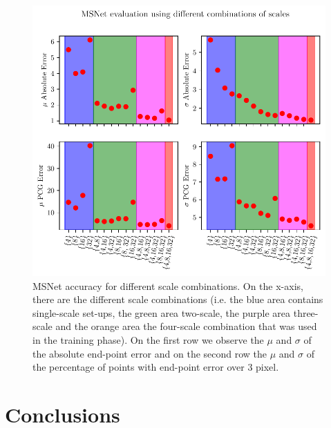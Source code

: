 \documentclass[10pt]{article}
\begin{document}
\begin{figure}
    \centering
    \includegraphics[width=\textwidth]{paper/latex/figures/msnet_scales_evaluation.pdf}
    \caption{MSNet accuracy for different scale combinations. On the x-axis, there are the different scale combinations (i.e. the blue area contains single-scale set-ups, the green area two-scale, the purple area three-scale and the orange area the four-scale combination that was used in the training phase). On the first row we observe the $\mu$ and $\sigma$ of the absolute end-point error and on the second row the $\mu$ and $\sigma$ of the percentage of points with end-point error over 3 pixel.}
    \label{fig:msnet_scales_evaluation}
\end{figure}








\section{Conclusions}




\end{document}
